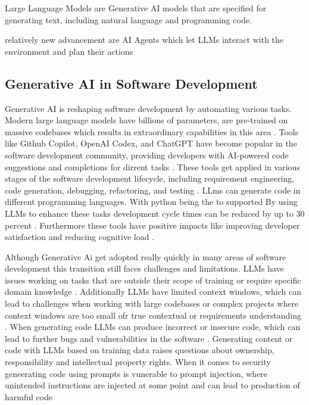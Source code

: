 Large Language Models are Generative AI models that are specified for generating text, including natural language and programming code.

relatively new advancement are AI Agents which let LLMs interact with the environment and plan their actions

\subsection{Generative AI in Software Development}
Generative AI is reshaping software development by automating various tasks. Modern large language models have billions of parameters, are pre-trained on massive codebases which results in extraordinary capabilities in this area \cite{chenUnveilingPitfallsUnderstanding2025}.
Tools like Github Copilot, OpenAI Codex, and ChatGPT have become popular in the software development community, providing developers with AI-powered code suggestions and completions for dirrent tasks \cite{bhargavmallampatiRoleGenerativeAI2025}. These tools get applied in various stages of the software development lifecycle, including requirement engineering, code generation, debugging, refactoring, and testing \cite{houLargeLanguageModels2024, puvvadiCodingAgentsComprehensive2025,bhargavmallampatiRoleGenerativeAI2025}. LLms can generate code in different programming languages. With python being the to supported %
By using LLMs to enhance these tasks development cycle times can be reduced by up to 30 percent \cite{bhargavmallampatiRoleGenerativeAI2025,kalliamvakouResearchQuantifyingGitHub2022}. Furthermore these tools have positive impacts like improving developer satisfaction and reducing cognitive load \cite{kalliamvakouResearchQuantifyingGitHub2022}.

Although Generative Ai get adopted really quickly in many areas of software development this transition still faces challenges and limitations.
LLMs have issues working on tasks that are outside their scope of training or require specific domain knowledge \cite{houLargeLanguageModels2024}.
Additionally LLMs have limited context windows, which can lead to challenges when working with large codebases or complex projects where context windows are too small ofr true contextual or requirements understanding \cite{bhargavmallampatiRoleGenerativeAI2025}.
When generating code LLMs can produce incorrect or insecure code, which can lead to further bugs and vulnerabilities in the software \cite{houLargeLanguageModels2024}.
Generating content or code with LLMs based on training data raises questions about ownership, responsibility and intellectual property rights.
When it comes to security geneerating code using prompts is vunerable to prompt injection, where unintended instructions are injected at some point and can lead to production of harmful code \cite{}

